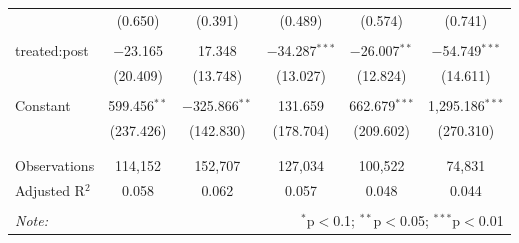 \begin{table}[!htbp]
\begin{tabular}{@{\extracolsep{0pt}}lccccc}
  & (0.650) & (0.391) & (0.489) & (0.574) & (0.741) \\ 
  & & & & & \\ 
 treated:post & $-$23.165 & 17.348 & $-$34.287$^{***}$ & $-$26.007$^{**}$ & $-$54.749$^{***}$ \\ 
  & (20.409) & (13.748) & (13.027) & (12.824) & (14.611) \\ 
  & & & & & \\ 
 Constant & 599.456$^{**}$ & $-$325.866$^{**}$ & 131.659 & 662.679$^{***}$ & 1,295.186$^{***}$ \\ 
  & (237.426) & (142.830) & (178.704) & (209.602) & (270.310) \\ 
  & & & & & \\ 
\hline \\[-1.8ex] 
Observations & 114,152 & 152,707 & 127,034 & 100,522 & 74,831 \\ 
Adjusted R$^{2}$ & 0.058 & 0.062 & 0.057 & 0.048 & 0.044 \\ 
\hline 
\hline \\[-1.8ex] 
\textit{Note:}  & \multicolumn{5}{r}{$^{*}$p$<$0.1; $^{**}$p$<$0.05; $^{***}$p$<$0.01} \\ 
\end{tabular} 
\end{table} 
